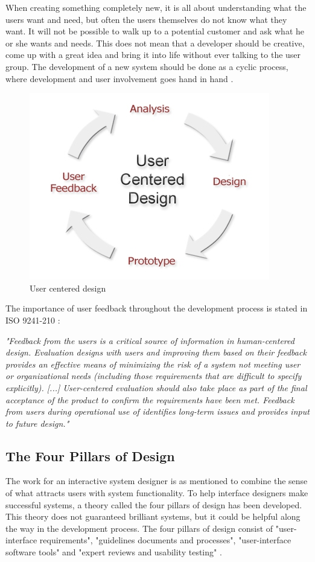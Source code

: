 When creating something completely new, it is all about understanding what the users want and need, but often the users themselves do not know what they want. It will not be possible to walk up to a potential customer and ask what he or she wants and needs. This does not mean that a developer should be creative, come up with a great idea and bring it into life without ever talking to the user group. The development of a new system should be done as a cyclic process, where development and user involvement goes hand in hand \cite{mmi}.  
\begin{figure} [ht!]
\centering
\includegraphics[scale=0.8]{userdesign.jpg}
\caption[User centered design]{User centered design \cite{userdesign}}
\label{userdesign}
\end{figure}

The importance of user feedback throughout the development process is stated in ISO 9241-210 \cite{dis20109241}:

\emph{"Feedback from the users is a critical source of information in human-centered design. Evaluation designs with users and improving them based on their feedback provides an effective means of minimizing the risk of a system not meeting user or organizational needs (including those requirements that are difficult to specify explicitly).  [...] User-centered evaluation should also take place as part of the final acceptance of the product to confirm the requirements have been met. Feedback from users during operational use of identifies long-term issues and provides input to future design."}
  
\subsection{The Four Pillars of Design}
The work for an interactive system designer is as mentioned to combine the sense of what attracts users with system functionality. To help interface designers make successful systems, a theory called the four pillars of design has been developed. This theory does not guaranteed brilliant systems, but it could be helpful along the way in the development process. The four pillars of design consist of "user-interface requirements", "guidelines documents and processes", "user-interface software tools" and "expert reviews and usability testing" \cite{mmi}.    


